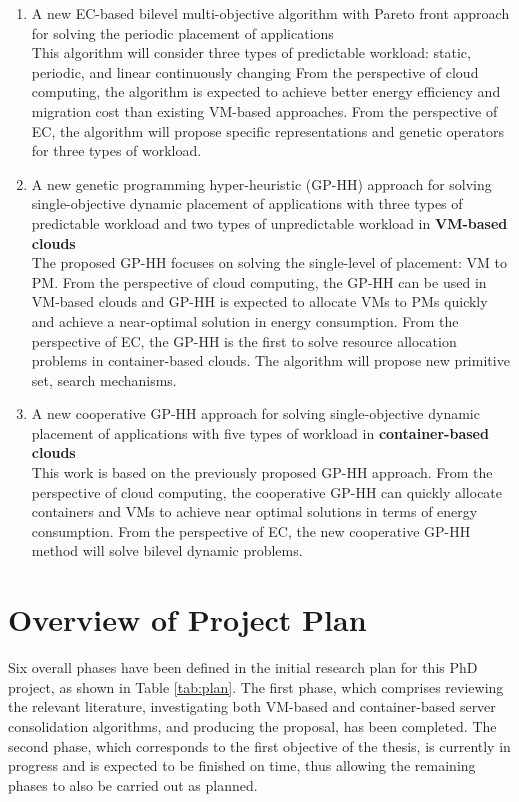 \begin{enumerate}
	\item A new EC-based bilevel multi-objective algorithm with Pareto front approach for solving the periodic placement of applications\\

	This algorithm will consider three types of predictable workload: static, periodic, and linear continuously changing From the perspective of cloud computing, the algorithm is expected to achieve better energy efficiency and migration cost than existing VM-based approaches. From the perspective of EC, the algorithm will propose specific representations and genetic operators for three types of workload. 

	\item A new genetic programming hyper-heuristic (GP-HH) approach for solving single-objective dynamic placement of applications with three types of predictable workload and two types of unpredictable workload in \textbf{VM-based clouds} \\

	The proposed GP-HH focuses on solving the single-level of placement: VM to PM. From the perspective of cloud computing,
	the GP-HH can be used in VM-based clouds and GP-HH is expected to allocate VMs to PMs quickly and achieve a near-optimal solution in energy consumption.
	From the perspective of EC,  the GP-HH is the first to solve resource allocation problems in container-based clouds. The algorithm will propose new primitive set, search mechanisms.

	\item A new cooperative GP-HH approach for solving single-objective dynamic placement of applications with five types of workload in \textbf{container-based clouds} \\

	This work is based on the previously proposed GP-HH approach.
	From the perspective of cloud computing, the cooperative GP-HH can quickly allocate containers and VMs to achieve near optimal solutions in terms of energy consumption.
	From the perspective of EC, the new cooperative GP-HH method will solve bilevel dynamic problems.
\end{enumerate}

\section{Overview of Project Plan}
Six overall phases have been defined in the initial research plan for this PhD project, as
shown in Table \ref{tab:plan}. The first phase, which comprises reviewing the relevant literature, investigating both VM-based and container-based server consolidation algorithms, and producing the proposal, has
been completed. The second phase, which corresponds to the first objective of the thesis, is
currently in progress and is expected to be finished on time, thus allowing the remaining
phases to also be carried out as planned.


